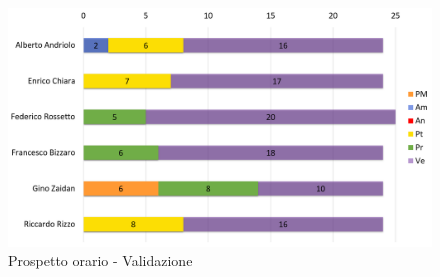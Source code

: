 \begin{figure}[H]
	\centering
	\includegraphics[width= 14cm]{immagini/va_istogramma.png}
	\caption{Prospetto orario - Validazione}
\end{figure}
\newpage

